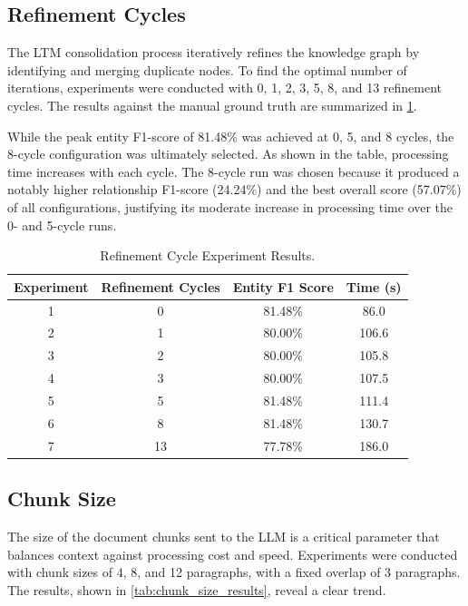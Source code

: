 \subsection{Refinement Cycles}
The LTM consolidation process iteratively refines the knowledge graph by identifying and merging duplicate nodes. To find the optimal number of iterations, experiments were conducted with 0, 1, 2, 3, 5, 8, and 13 refinement cycles. The results against the manual ground truth are summarized in \cref{tab:refinement_cycle_results}.

While the peak entity F1-score of 81.48\% was achieved at 0, 5, and 8 cycles, the 8-cycle configuration was ultimately selected. As shown in the table, processing time increases with each cycle. The 8-cycle run was chosen because it produced a notably higher relationship F1-score (24.24\%) and the best overall score (57.07\%) of all configurations, justifying its moderate increase in processing time over the 0- and 5-cycle runs.

\begin{table}[!htbp]
\centering
\begin{tabular}{@{}cccc@{}}
\toprule
\textbf{Experiment} & \textbf{Refinement Cycles} & \textbf{Entity F1 Score} & \textbf{Time (s)} \\ \midrule
1 & 0 & 81.48\% & 86.0 \\
2 & 1 & 80.00\% & 106.6 \\
3 & 2 & 80.00\% & 105.8 \\
4 & 3 & 80.00\% & 107.5 \\
5 & 5 & 81.48\% & 111.4 \\
6 & 8 & 81.48\% & 130.7 \\
7 & 13 & 77.78\% & 186.0 \\ \bottomrule
\end{tabular}
\caption{Refinement Cycle Experiment Results.}
\label{tab:refinement_cycle_results}
\end{table}

\subsection{Chunk Size}
The size of the document chunks sent to the LLM is a critical parameter that balances context against processing cost and speed. Experiments were conducted with chunk sizes of 4, 8, and 12 paragraphs, with a fixed overlap of 3 paragraphs. The results, shown in \cref{tab:chunk_size_results}, reveal a clear trend.


